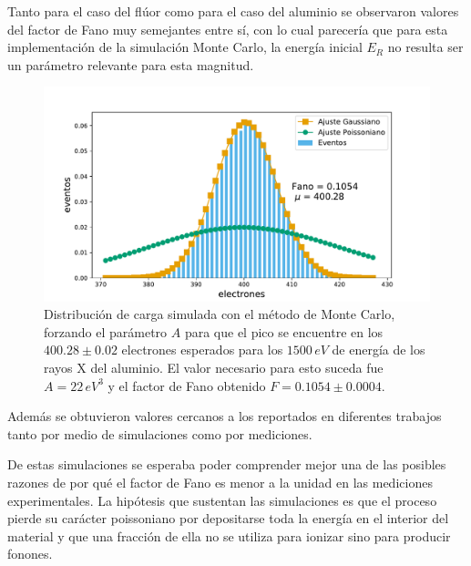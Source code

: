 Tanto para el caso del flúor como para el caso del aluminio se observaron valores del factor de Fano muy semejantes entre sí, con lo cual parecería que para esta implementación de la simulación Monte Carlo, la energía inicial $E_{R}$ no resulta ser un parámetro relevante para esta magnitud.
\begin{figure}[h]
    \centering
    \includegraphics[scale=0.5]{Figs/Al_Fano_1500_A22.0_Eloss0_100ktrials.pdf}
    \caption{Distribución de carga simulada con el método de Monte Carlo, forzando el parámetro $A$ para que el pico se encuentre en los $400.28 \pm 0.02 $ electrones esperados para los $1500\,\si{eV}$ de energía de los rayos X del aluminio. El valor necesario para esto suceda fue $A=22\,\si{eV}^{3}$ y el factor de Fano obtenido $F = 0.1054 \pm 0.0004$.}
    \label{fig:Al_fano_A22}
\end{figure}
Además se obtuvieron valores cercanos a los reportados en diferentes trabajos\cite{Ryan, Alig, Janesick2, Fraser, Owens} tanto por medio de simulaciones como por mediciones.

De estas simulaciones se esperaba poder comprender mejor una de las posibles razones de por qué el factor de Fano es menor a la unidad en las mediciones experimentales. La hipótesis que sustentan las simulaciones es que el proceso pierde su carácter poissoniano por depositarse toda la energía en el interior del material y que una fracción de ella no se utiliza para ionizar sino para producir fonones.
